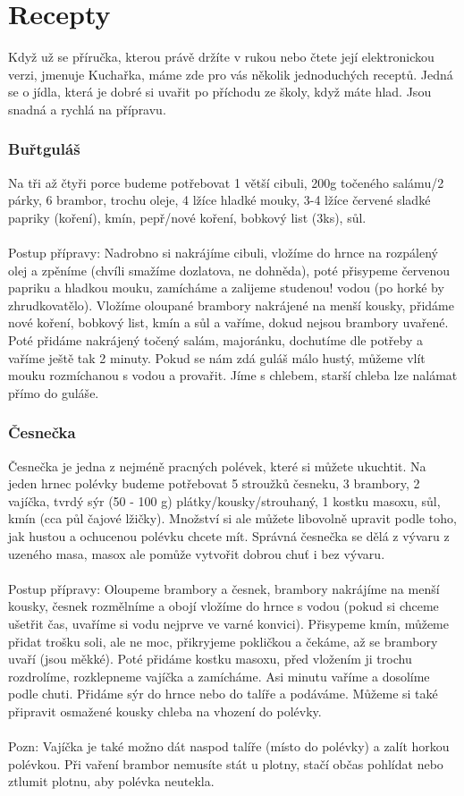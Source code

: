 \section{Recepty}
Když už se příručka, kterou právě držíte v rukou nebo čtete její elektronickou
verzi, jmenuje Kuchařka, máme zde pro vás několik jednoduchých receptů. Jedná se
o jídla, která je dobré si uvařit po příchodu ze školy, když máte hlad. Jsou
snadná a rychlá na přípravu.


\subsubsection*{Buřtguláš}
Na tři až čtyři porce budeme potřebovat 1 větší cibuli, 200g točeného salámu/2
párky, 6 brambor, trochu oleje, 4 lžíce hladké mouky, 3-4 lžíce červené sladké
papriky (koření), kmín, pepř/nové koření, bobkový list (3ks), sůl.
\\\\
Postup přípravy: Nadrobno si nakrájíme cibuli, vložíme do hrnce na rozpálený
olej a zpěníme (chvíli smažíme dozlatova, ne dohněda), poté přisypeme červenou
papriku a hladkou mouku, zamícháme a zalijeme studenou! vodou (po horké by
zhrudkovatělo). Vložíme oloupané brambory nakrájené na menší kousky, přidáme
nové koření, bobkový list, kmín a sůl a vaříme, dokud nejsou brambory uvařené.
Poté přidáme nakrájený točený salám, majoránku, dochutíme dle potřeby a vaříme
ještě tak 2 minuty. Pokud se nám zdá guláš málo hustý, můžeme vlít mouku
rozmíchanou s vodou a provařit. Jíme s chlebem, starší chleba lze nalámat přímo
do guláše.


\subsubsection*{Česnečka}
Česnečka je jedna z nejméně pracných polévek, které si můžete ukuchtit. Na jeden
hrnec polévky budeme potřebovat 5 stroužků česneku, 3 brambory, 2 vajíčka, tvrdý
sýr (50 - 100 g) plátky/kousky/strouhaný, 1 kostku masoxu, sůl, kmín (cca půl
čajové lžičky). Množství si ale můžete libovolně upravit podle toho, jak hustou
a ochucenou polévku chcete mít. Správná česnečka se dělá z vývaru z uzeného
masa, masox ale pomůže vytvořit dobrou chuť i bez vývaru.
\\\\
Postup přípravy: Oloupeme brambory a česnek, brambory nakrájíme na menší kousky,
česnek rozmělníme a obojí vložíme do hrnce s vodou (pokud si chceme ušetřit čas,
uvaříme si vodu nejprve ve varné konvici). Přisypeme kmín, můžeme přidat trošku
soli, ale ne moc, přikryjeme pokličkou a čekáme, až se brambory uvaří (jsou
měkké). Poté přidáme kostku masoxu, před vložením ji trochu rozdrolíme,
rozklepneme vajíčka a zamícháme. Asi minutu vaříme a dosolíme podle chuti.
Přidáme sýr do hrnce nebo do talíře a podáváme. Můžeme si také připravit
osmažené kousky chleba na vhození do polévky.
\\\\
Pozn: Vajíčka je také možno dát naspod talíře (místo do polévky) a zalít horkou
polévkou. Při vaření brambor nemusíte stát u plotny, stačí občas pohlídat nebo
ztlumit plotnu, aby polévka neutekla.


